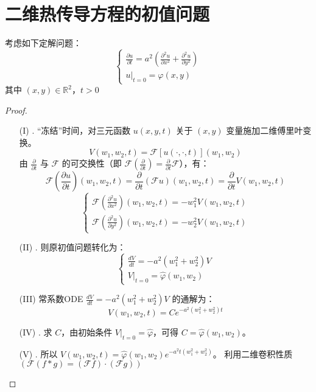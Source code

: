 \documentclass[linespread=1.5,openany]{book}%
\theoremstyle{plain}
\begin{document}
{{{					\section{二维热传导方程的初值问题}
					考虑如下定解问题：
					\[
					\begin{cases}
						\frac{\partial u}{\partial t}=a^{2}\left(\frac{\partial^{2}u}{\partial x^{2}}+\frac{\partial^{2}u}{\partial y^{2}}\right)\\
						\left.u\right|_{t = 0}=\varphi(x,y)
					\end{cases}
					\]
					其中 \((x,y)\in\mathbb{R}^{2}\)，\(t>0\)
					\begin{proof}
						\begin{itemize}
							\item[(I)]. “冻结”时间，对三元函数 \(u(x,y,t)\) 关于 \((x,y)\) 变量施加二维傅里叶变换。
							\[V(w_{1},w_{2},t)=\mathcal{F}[u(\cdot,\cdot,t)](w_{1},w_{2})\]
							由 \(\frac{\partial}{\partial t}\) 与 \(\mathcal{F}\) 的可交换性（即 \(\mathcal{F}(\frac{\partial}{\partial t})=\frac{\partial}{\partial t}\mathcal{F}\)），有：
							\[
							\mathcal{F}\left(\frac{\partial u}{\partial t}\right)(w_{1},w_{2},t)=\frac{\partial}{\partial t}(\mathcal{F}u)(w_{1},w_{2},t)=\frac{\partial}{\partial t}V(w_{1},w_{2},t)
							\]\[\begin{cases}
								\mathcal{F}\left(\frac{\partial^{2}u}{\partial x^{2}}\right)(w_{1},w_{2},t)=-w_{1}^{2}V(w_{1},w_{2},t)\\
								\mathcal{F}\left(\frac{\partial^{2}u}{\partial y^{2}}\right)(w_{1},w_{2},t)=-w_{2}^{2}V(w_{1},w_{2},t)\end{cases}\]
							\item[(II)]. 则原初值问题转化为：
							\[
							\begin{cases}
								\frac{d V}{d t}=-a^{2}(w_{1}^{2}+w_{2}^{2})V\\
								\left.V\right|_{t = 0}=\hat{\varphi}(w_{1},w_{2})
							\end{cases}
							\]
							\item[(III)]  常系数ODE \(\frac{dV}{dt}=-a^{2}(w_{1}^{2}+w_{2}^{2})V\) 的通解为：
							\[
							V(w_{1},w_{2},t)=C e^{-a^{2}(w_{1}^{2}+w_{2}^{2})t}
							\]
							\item[(IV)]. 求 \(C\)，由初始条件 \(\left.V\right|_{t = 0}=\hat{\varphi}\)，可得 \(C = \hat{\varphi}(w_{1},w_{2})\)。
							\item[(V)]. 所以 \(V(w_{1},w_{2},t)=\hat{\varphi}(w_{1},w_{2})e^{-a^{2}t(w_{1}^{2}+w_{2}^{2})}\)。
							利用二维卷积性质 \((\mathcal{F}(f*g)=(\mathcal{F}f)\cdot(\mathcal{F}g))\)

\end{itemize}
\end{proof}}}}
\end{document}
